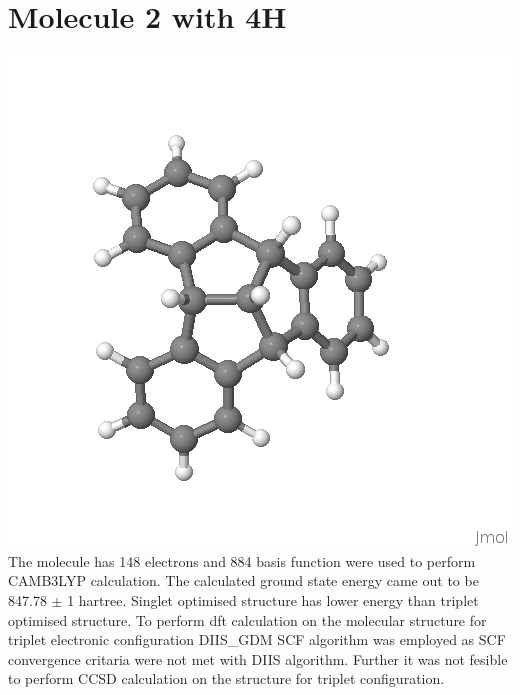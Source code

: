 \documentclass{article}
\begin{document}
\section{Molecule 2 with 4H}
\includegraphics[scale=0.5]{M2_h_0001.png}\\
The molecule has 148 electrons and 884 basis function were used to perform CAMB3LYP calculation. The calculated ground state energy came out to be 847.78 \( \pm \) 1 hartree. Singlet optimised structure has lower energy than triplet optimised structure. To perform dft calculation on the molecular structure for triplet electronic configuration DIIS\_GDM SCF algorithm was employed as SCF convergence critaria  were not met with DIIS algorithm. Further it was not fesible to perform CCSD calculation on the structure for triplet configuration.
\end{document}

